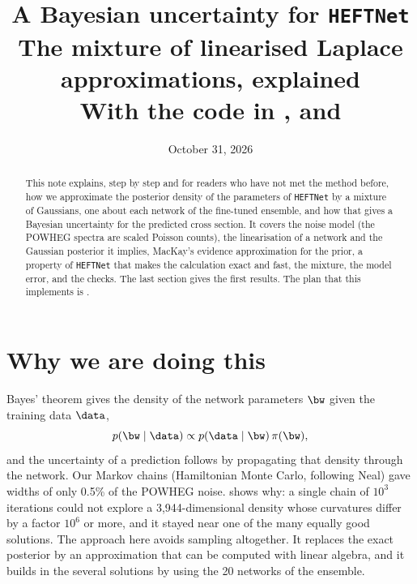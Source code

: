 
\newcommand{\what}{\hat{\boldsymbol{\omega}}}
\newcommand{\bj}{\boldsymbol{j}}
\newcommand{\bC}{\boldsymbol{C}}

\title{\textbf{A Bayesian uncertainty for \texttt{HEFTNet}}\\[4pt]
\large The mixture of linearised Laplace approximations, explained\\[4pt]
\normalsize With the code in ,  and
}
\date{October 31, 2026}


\maketitle

\begin{abstract}
\noindent
This note explains, step by step and for readers who have not met the method before, how
we approximate the posterior density of the parameters of \texttt{HEFTNet} by a mixture of
Gaussians, one about each network of the fine-tuned ensemble, and how that gives a
Bayesian uncertainty for the predicted cross section. It covers the noise model (the
POWHEG spectra are scaled Poisson counts), the linearisation of a network and the
Gaussian posterior it implies, MacKay's evidence approximation for the prior, a property
of \texttt{HEFTNet} that makes the calculation exact and fast, the mixture, the model error,
and the checks. The last section gives the first results. The plan that this implements is
.
\end{abstract}

\tableofcontents

\section{Why we are doing this}

Bayes' theorem gives the density of the network parameters $\bw$ given the training data
$\data$,
\begin{equation}
  p(\bw \mid \data) \propto p(\data \mid \bw)\, \pi(\bw) ,
\end{equation}
and the uncertainty of a prediction follows by propagating that density through the
network. Our Markov chains (Hamiltonian Monte Carlo, following Neal) gave widths of only
0.5\% of the POWHEG noise.  shows why: a single chain of $10^3$
iterations could not explore a 3,944-dimensional density whose curvatures differ by a
factor $10^6$ or more, and it stayed near one of the many equally good solutions. The
approach here avoids sampling altogether. It replaces the exact posterior by an
approximation that can be computed with linear algebra, and it builds in the several
solutions by using the 20 networks of the ensemble.

